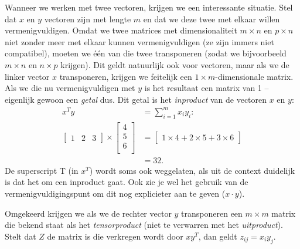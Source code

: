 Wanneer we werken met twee vectoren, krijgen we een interessante situatie. Stel dat $x$ en $y$ vectoren zijn met lengte $m$ en dat we deze twee met elkaar willen vermenigvuldigen. Omdat we twee matrices met dimensionaliteit $m \times n$ en $p \times n$ niet zonder meer met elkaar kunnen vermenigvuldigen (ze zijn immers niet compatibel), moeten we één van die twee transponeren (zodat we bijvoorbeeld $m \times n$ en $n \times p$ krijgen). Dit geldt natuurlijk ook voor vectoren, maar als we de linker vector $x$ transponeren, krijgen we feitelijk een $1 \times m$-dimensionale matrix. Als we die nu vermenigvuldigen met $y$ is het resultaat een matrix van 1  – eigenlijk gewoon een \textit{getal} dus. Dit getal is het \textit{inproduct} van de vectoren $x$ en $y$:
\[
\begin{aligned}
x^Ty &= \sum_{i=1}^m{x_iy_i}: \\
\begin{bmatrix}
1 & 2 & 3
\end{bmatrix} \times
\begin{bmatrix}
4\\5\\6\\
\end{bmatrix} &= 
\begin{bmatrix}
1 \times 4 + 2 \times 5 + 3 \times 6
\end{bmatrix}\\
&=32.
\end{aligned}
\]
%
De superscript T (in $x^T$) wordt soms ook weggelaten, als uit de context duidelijk is dat het om een inproduct gaat. Ook zie je wel het gebruik van de vermenigvuldigingspunt om dit nog explicieter aan te geven ($x \cdot y$). 

Omgekeerd krijgen we als we de rechter vector $y$ transponeren een $m \times m$ matrix die bekend staat als het \textit{tensorproduct} (niet te verwarren met het \textit{uitproduct}). Stelt dat $Z$ de matrix is die verkregen wordt door $xy^T$, dan geldt $z_{ij}=x_iy_j$. 

